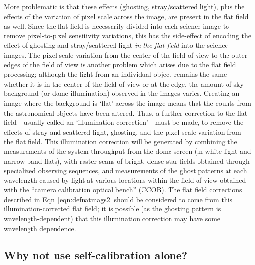 \documentclass[12pt,preprint]{aastex}
\begin{document}
More problematic is that these effects (ghosting, stray/scattered
light), plus the effects of the variation of pixel scale across the
image, are present in the flat field as well. Since the flat field is
necessarily divided into each science image to remove pixel-to-pixel
sensitivity variations, this has the side-effect of encoding the
effect of ghosting and stray/scattered light {\it in the flat field}
into the science images. The pixel scale variation from the center of
the field of view to the outer edges of the field of view is another
problem which arises due to the flat field processing; although the
light from an individual object remains the same whether it is in the
center of the field of view or at the edge, the amount of sky
background (or dome illumination) observed in the images varies.
Creating an image where the background is `flat' across the image
means that the counts from the astronomical objects have been altered.
Thus, a further correction to the flat field - usually called
an `illumination correction' - must be made, to remove the effects of
stray and scattered light, ghosting, and the pixel scale variation
from the flat field. This illumination correction will be generated by
combining the measurements of the system throughput from the dome
screen (in white-light and narrow band flats), with raster-scans of
bright, dense star fields obtained through specialized observing
sequences, and measurements of the ghost patterns at each wavelength
caused by light at various locations within the field of view obtained
with the ``camera calibration optical bench'' (CCOB).  The flat field
corrections described in Eqn~\ref{eqn:defnatmags2} should be considered to
come from this illumination-corrected flat field; it is possible (as
the ghosting pattern is wavelength-dependent) that this illumination
correction may have some wavelength dependence. 
 
\subsection{Why not use self-calibration alone?}
\end{document}
